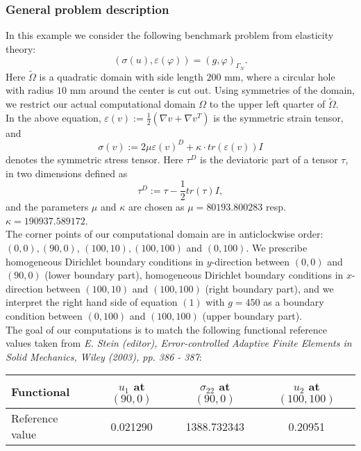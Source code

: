 \subsubsection{General problem description}

In this example we consider the following benchmark problem from elasticity theory:  
\begin{equation}
   (\sigma(u),\varepsilon(\varphi)) = (g,\varphi)_{\Gamma_N}.
\end{equation}
Here $\tilde{\Omega}$ is a quadratic domain with side length $200$ mm, where a circular hole with radius $10$ mm around the center is cut out. Using symmetries of the domain, we restrict our actual computational domain $\Omega$ to the upper left quarter of $\tilde{\Omega}$.\\
In the above equation, $\varepsilon(v) := \frac{1}{2}(\nabla v + \nabla v^T)$ is the symmetric strain tensor, and 
\begin{equation*}
   \sigma(v) := 2\mu \varepsilon(v)^D + \kappa \cdot tr (\varepsilon(v)) I
\end{equation*}
denotes the symmetric stress tensor. Here $\tau^D$ is the deviatoric part of a tensor $\tau$, in two dimensions defined as 
\begin{equation*}
   \tau^D := \tau - \frac{1}{2} tr(\tau) I,
\end{equation*}
and the parameters $\mu$ and $\kappa$ are chosen as $\mu = 80193.800283$ resp. $\kappa = 190937.589172$.\\
The corner points of our computational domain are in anticlockwise order: $(0,0), (90,0)$, $(100,10), (100,100)$ and $(0,100)$. We prescribe homogeneous Dirichlet boundary conditions in $y$-direction between $(0,0)$ and $(90,0)$ (lower boundary part), homogeneous Dirichlet boundary conditions in $x$-direction between $(100,10)$ and $(100,100)$ (right boundary part), and we interpret the right hand side of equation $(1)$ with $g = 450$ as a boundary condition between $(0,100)$ and $(100,100)$ (upper boundary part).\\
The goal of our computations is to match the following functional reference values taken from \textit{E. Stein (editor), Error-controlled Adaptive Finite Elements in Solid Mechanics, Wiley (2003), pp. 386 - 387}:
\begin{table}[h]
\centering
\begin{tabular}{lccc}    
\hline
 Functional & $u_1$ at $(90,0)$ & $\sigma_{22}$ at $(90,0)$ & $u_2$ at $(100,100)$\\
\hline 
 Reference value & 0.021290 & 1388.732343 & 0.20951\\
\hline
\end{tabular}
\end{table}
